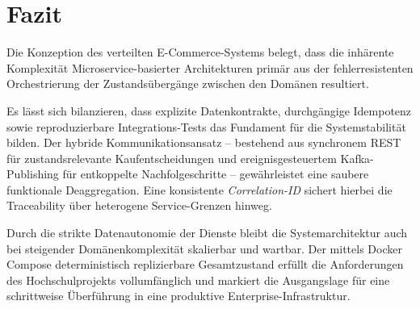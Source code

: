 \documentclass[
  11pt,
  a4paper,
  oneside,
  headings=normal,
  parskip=half,
  DIV=12
]{scrreprt}
\begin{document}
\chapter{Fazit}

Die Konzeption des verteilten E-Commerce-Systems belegt, dass die inhärente Komplexität Microservice-basierter Architekturen primär aus der fehlerresistenten Orchestrierung der Zustandsübergänge zwischen den Domänen resultiert.

Es lässt sich bilanzieren, dass explizite Datenkontrakte, durchgängige Idempotenz sowie reproduzierbare Integrations-Tests das Fundament für die Systemstabilität bilden. Der hybride Kommunikationsansatz – bestehend aus synchronem REST für zustandsrelevante Kaufentscheidungen und ereignisgesteuertem Kafka-Publishing für entkoppelte Nachfolgeschritte – gewährleistet eine saubere funktionale Deaggregation. Eine konsistente \textit{Correlation-ID} sichert hierbei die Traceability über heterogene Service-Grenzen hinweg.

Durch die strikte Datenautonomie der Dienste bleibt die Systemarchitektur auch bei steigender Domänenkomplexität skalierbar und wartbar. Der mittels Docker Compose deterministisch replizierbare Gesamtzustand erfüllt die Anforderungen des Hochschulprojekts vollumfänglich und markiert die Ausgangslage für eine schrittweise Überführung in eine produktive Enterprise-Infrastruktur.

\printbibliography[heading=bibintoc,title={Literaturverzeichnis}]
\end{document}
